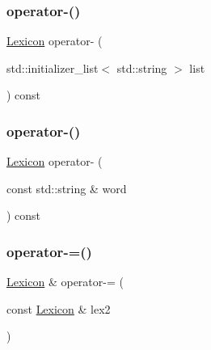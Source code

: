 \mbox{\label{classLexicon_a0cd415d08567bfae9eae12afe2169cb5}} 
\subsubsection{\texorpdfstring{operator-\/()}{operator-()}\hspace{0.1cm}{\footnotesize\ttfamily [2/3]}}
{\footnotesize\ttfamily \mbox{\hyperlink{classLexicon}{Lexicon}} operator-\/ (\begin{DoxyParamCaption}\item[{std\+::initializer\+\_\+list$<$ std\+::string $>$}]{list }\end{DoxyParamCaption}) const}

\mbox{\label{classLexicon_a14c8fea4b958b02ea5ee55d5509db8e6}} 
\subsubsection{\texorpdfstring{operator-\/()}{operator-()}\hspace{0.1cm}{\footnotesize\ttfamily [3/3]}}
{\footnotesize\ttfamily \mbox{\hyperlink{classLexicon}{Lexicon}} operator-\/ (\begin{DoxyParamCaption}\item[{const std\+::string \&}]{word }\end{DoxyParamCaption}) const}

\mbox{\label{classLexicon_ac51e54102d6257c1a0a48c99ad2520f6}} 
\subsubsection{\texorpdfstring{operator-\/=()}{operator-=()}\hspace{0.1cm}{\footnotesize\ttfamily [1/3]}}
{\footnotesize\ttfamily \mbox{\hyperlink{classLexicon}{Lexicon}} \& operator-\/= (\begin{DoxyParamCaption}\item[{const \mbox{\hyperlink{classLexicon}{Lexicon}} \&}]{lex2 }\end{DoxyParamCaption})}

